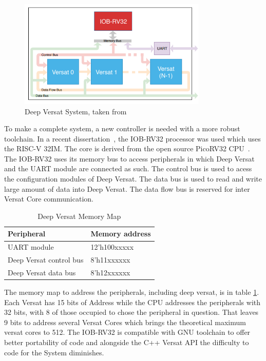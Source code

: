 \begin{figure}[!htbp]
    \centering
    \includegraphics[width=0.8\textwidth]{Figures/deep-versat-top.png}
    \caption{Deep Versat System, taken from~\cite{valter:deepversat}}
    \label{figure:deepversattop}
\end{figure} 

\quad To make a complete system, a new controller is needed with a more robust toolchain.
In a recent dissertation~\cite{valter:deepversat}, the IOB-RV32 processor was used which uses the RISC-V 32IM. The core is derived from
the open source PicoRV32 CPU~\cite{picorv}.
The IOB-RV32 uses its memory bus to access peripherals in which Deep Versat and the UART module are connected as such.
The control bus is used to acess the configuration modules of Deep Versat. The data bus is used to read and write
large amount of data into Deep Versat. The data flow bus is reserved for inter Versat Core communication.

\begin{table}[!htbp]
    \centering
    \begin{tabular}{|ll|}
        \hline
        \textbf{Peripheral}     & \textbf{Memory address} \\ \hline
        UART module             & 12’h100xxxxx            \\ \hline
        Deep Versat control bus & 8’h11xxxxxx             \\ \hline
        Deep Versat data bus    & 8’h12xxxxxx             \\ \hline
        \end{tabular}
    \caption{Deep Versat Memory Map}
    \label{table:deepversat}
    \end{table}


The memory map to address the peripherals,
 including deep versat, is in table \ref{table:deepversat}.
 Each Versat has 15 bits of Address while the CPU addresses
 the peripherals with 32 bits, with 8 of those occupied to chose
 the peripheral in question. That leaves 9 bits to address several Versat Cores
 which brings the theoretical maximum versat cores to 512. The IOB-RV32 is compatible with
 GNU toolchain to offer better portability of code and alongside the C++ Versat API the difficulty
 to code for the System diminishes.
